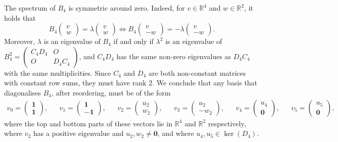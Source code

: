 \documentclass[a4paper]{article}
\theoremstyle{definition}
\newcommand{\RR}{\mathbb R}
\newcommand{\one}{\mathbf 1}
\newcommand{\zero}{\mathbf 0}
\begin{document}
The spectrum of $B_4$ is symmetric around zero.
Indeed, for $v \in \RR^4$ and $w \in \RR^2$, it holds that 
\[
B_4 \begin{pmatrix} v \\ w \end{pmatrix} = \lambda \begin{pmatrix} v \\ w \end{pmatrix} 
 \iff 
B_4 \begin{pmatrix} v \\ -w \end{pmatrix} = -\lambda \begin{pmatrix} v \\ -w \end{pmatrix}.
\]
Moreover, $\lambda$ is an eigenvalue of $B_4$ if and only if $\lambda^2$ is an eigenvalue of $B_4^2 = \begin{pmatrix}
 C_4 D_4 & O \\ O & D_4 C_4
\end{pmatrix}$, and $C_4 D_4$ has the same non-zero eigenvalues as $D_4 C_4$ with the same multiplicities.
Since $C_4$ and $D_4$ are both non-constant matrices with constant row sums, they must have rank 2.
We conclude that any basis that diagonalises $B_4$, after reordering, must be of the form
\begin{align*}
 v_0 = \begin{pmatrix} \one \\ \one \end{pmatrix}, &&
 v_1 = \begin{pmatrix} \one \\ -\one \end{pmatrix}, &&
 v_2 = \begin{pmatrix} u_2 \\ w_2 \end{pmatrix}, &&
 v_3 = \begin{pmatrix} u_2 \\ -w_2 \end{pmatrix}, &&
 v_4 = \begin{pmatrix} u_4 \\ \zero \end{pmatrix}, &&
 v_5 = \begin{pmatrix} u_5 \\ \zero \end{pmatrix}, &&
\end{align*}
where the top and bottom parts of these vectors lie in $\RR^4$ and $\RR^2$ respectively, where $v_2$ has a positive eigenvalue and $u_2, w_2 \neq \zero$, and where $u_4, u_5 \in \ker(D_4)$.
\end{document}

